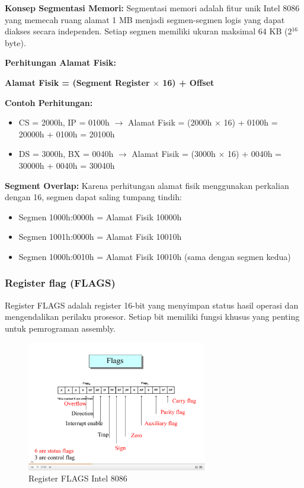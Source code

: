 \documentclass[../main.tex]{subfiles}
\begin{document}
\textbf{Konsep Segmentasi Memori:}
Segmentasi memori adalah fitur unik Intel 8086 yang memecah ruang alamat 1 MB menjadi segmen-segmen logis yang dapat diakses secara independen. Setiap segmen memiliki ukuran maksimal 64 KB (2$^{16}$ byte).

\textbf{Perhitungan Alamat Fisik:}
\begin{center}
\textbf{Alamat Fisik = (Segment Register $\times$ 16) + Offset}
\end{center}

\textbf{Contoh Perhitungan:}
\begin{itemize}
    \item CS = 2000h, IP = 0100h $\rightarrow$ Alamat Fisik = (2000h $\times$ 16) + 0100h = 20000h + 0100h = 20100h
    \item DS = 3000h, BX = 0040h $\rightarrow$ Alamat Fisik = (3000h $\times$ 16) + 0040h = 30000h + 0040h = 30040h
\end{itemize}

\textbf{Segment Overlap:}
Karena perhitungan alamat fisik menggunakan perkalian dengan 16, segmen dapat saling tumpang tindih:
\begin{itemize}
    \item Segmen 1000h:0000h = Alamat Fisik 10000h
    \item Segmen 1001h:0000h = Alamat Fisik 10010h
    \item Segmen 1000h:0010h = Alamat Fisik 10010h (sama dengan segmen kedua)
\end{itemize}

\subsubsection{Register flag (FLAGS)}
Register FLAGS adalah register 16-bit yang menyimpan status hasil operasi dan mengendalikan perilaku prosesor. Setiap bit memiliki fungsi khusus yang penting untuk pemrograman assembly.

\begin{figure}[h]
\centering
\includegraphics[width=0.7\textwidth]{../images/8086_flags_register.png}
\caption{Register FLAGS Intel 8086}
\label{fig:8086-flags-register}
\end{figure}
\end{document}

